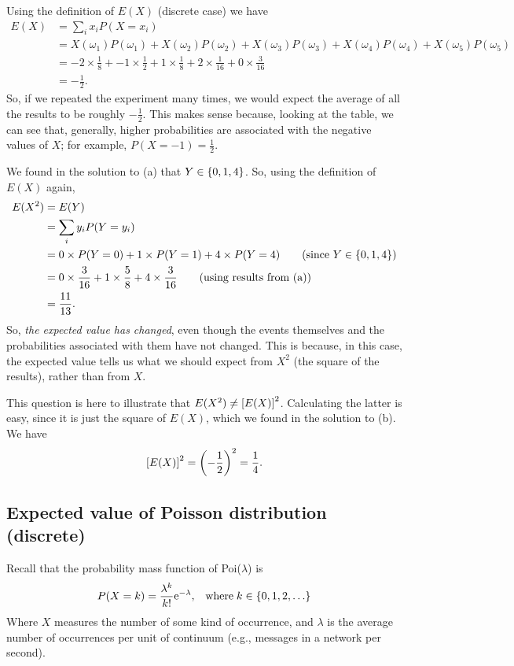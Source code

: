 \solution[to (b)]
Using the definition of $E(X)$ (discrete case) we have
\begin{align*}
E(X)  & = \sum_i x_iP(X = x_i) \\
	& = X(\omega_1)P(\omega_1) + X(\omega_2)P(\omega_2) + X(\omega_3)P(\omega_3) + X(\omega_4)P(\omega_4) + X(\omega_5)P(\omega_5) \\
	& = -2\times\frac{1}{8} + -1\times\frac{1}{2} + 1\times\frac{1}{8} + 2\times\frac{1}{16} + 0\times\frac{3}{16} \tag{from the table} \\
	& = -\frac{1}{2}.
\end{align*}
So, if we repeated the experiment many times, we would expect the average of all the results to be roughly $-\frac{1}{2}$. This makes sense because, looking at the table, we can see that, generally, higher probabilities are associated with the negative values of $X$; for example, $P(X = -1) = \frac{1}{2}$. \\
\bigskip

\solution[to (c)]
We found in the solution to (a) that $Y \in \left\{0,1,4\right\}$. So, using the definition of $E(X)$ again,
\begin{align*}
E(X^2) & = E(Y)  \\
	    & = \sum_i y_i P(Y = y_i) \\
	    & = 0\times P(Y = 0) + 1\times P(Y = 1) + 4\times P(Y = 4) \tag{since $Y \in \set{0,1,4}$} \\
	    & = 0\times\frac{3}{16} + 1\times\frac{5}{8} + 4\times\frac{3}{16} \tag{using results from (a)} \\
	    & = \frac{11}{13}. 
\end{align*}
So, \textit{the expected value has changed}, even though the events themselves and the probabilities associated with them have not changed. This is because, in this case, the expected value tells us what we should expect from $X^2$ (the square of the results), rather than from $X$. \\
\bigskip

\solution[to (d)]
This question is here to illustrate that $E(X^2) \neq \left[E(X)\right]^2$. Calculating the latter is easy, since it is just the square of $E(X)$, which we found in the solution to (b). We have
\[
\left[E(X)\right]^2 = \left(-\frac{1}{2}\right)^2 = \frac{1}{4}.
\]


\subsection{Expected value of Poisson distribution (discrete)} \label{meanPoisson}
Recall that the probability mass function of Poi($\lambda$) is
\[
P(X = k) = \frac{\lambda^k}{k!}\mathrm{e}^{-\lambda}, \;\;\; \text{where} \; k \in \left\{0,1,2,\ldots\right\} 
\]
Where $X$ measures the number of some kind of occurrence, and $\lambda$ is the average number of occurrences per unit of continuum (e.g., messages in a network per second). \\

